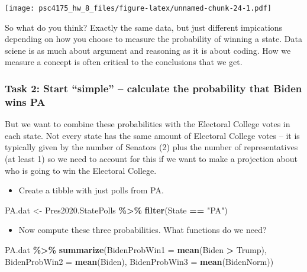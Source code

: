 \documentclass[
]{article}
\newenvironment{Shaded}{\begin{snugshade}}{\end{snugshade}}
\newcommand{\AttributeTok}[1]{\textcolor[rgb]{0.13,0.29,0.53}{#1}}
\newcommand{\FunctionTok}[1]{\textcolor[rgb]{0.13,0.29,0.53}{\textbf{#1}}}
\newcommand{\NormalTok}[1]{#1}
\newcommand{\OtherTok}[1]{\textcolor[rgb]{0.56,0.35,0.01}{#1}}
\newcommand{\SpecialCharTok}[1]{\textcolor[rgb]{0.81,0.36,0.00}{\textbf{#1}}}
\newcommand{\StringTok}[1]{\textcolor[rgb]{0.31,0.60,0.02}{#1}}
\providecommand{\tightlist}{%
  \setlength{\itemsep}{0pt}\setlength{\parskip}{0pt}}
\begin{document}
\texttt{[image: psc4175\_hw\_8\_files/figure-latex/unnamed-chunk-24-1.pdf]}

So what do you think? Exactly the same data, but just different
impications depending on how you choose to measure the probability of
winning a state. Data sciene is as much about argument and reasoning as
it is about coding. How we measure a concept is often critical to the
conclusions that we get.

\subsubsection{Task 2: Start ``simple'' -- calculate the probability
that Biden wins
PA}\label{task-2-start-simple-calculate-the-probability-that-biden-wins-pa}

But we want to combine these probabilities with the Electoral College
votes in each state. Not every state has the same amount of Electoral
College votes -- it is typically given by the number of Senators (2)
plus the number of representatives (at least 1) so we need to account
for this if we want to make a projection about who is going to win the
Electoral College.

\begin{itemize}
\tightlist
\item
  Create a tibble with just polls from PA.
\end{itemize}

\begin{Shaded}
\begin{Highlighting}[]
\NormalTok{PA.dat }\OtherTok{\textless{}{-}}\NormalTok{ Pres2020.StatePolls }\SpecialCharTok{\%\textgreater{}\%} 
  \FunctionTok{filter}\NormalTok{(State }\SpecialCharTok{==} \StringTok{"PA"}\NormalTok{)}
\end{Highlighting}
\end{Shaded}

\begin{itemize}
\tightlist
\item
  Now compute these three probabilities. What functions do we need?
\end{itemize}

\begin{Shaded}
\begin{Highlighting}[]
\NormalTok{PA.dat }\SpecialCharTok{\%\textgreater{}\%}
      \FunctionTok{summarize}\NormalTok{(}\AttributeTok{BidenProbWin1 =} \FunctionTok{mean}\NormalTok{(Biden }\SpecialCharTok{\textgreater{}}\NormalTok{ Trump),}
                \AttributeTok{BidenProbWin2 =} \FunctionTok{mean}\NormalTok{(Biden),  }
                \AttributeTok{BidenProbWin3 =} \FunctionTok{mean}\NormalTok{(BidenNorm))}
\end{Highlighting}
\end{Shaded}
\end{document}
